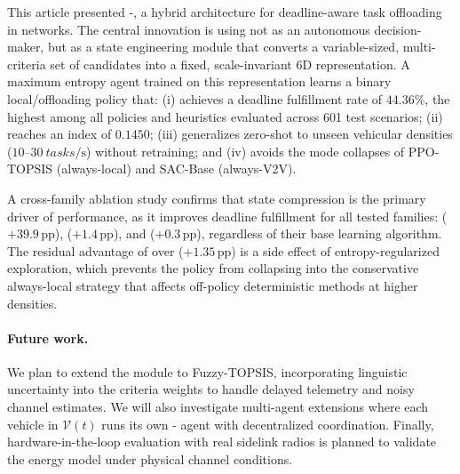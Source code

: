 This article presented -, a hybrid architecture for deadline-aware task offloading in  networks. The central innovation is using  not as an autonomous decision-maker, but as a state engineering module that converts a variable-sized, multi-criteria set of candidates into a fixed, scale-invariant 6D representation. A maximum entropy  agent trained on this representation learns a binary local/offloading policy that:
(i) achieves a deadline fulfillment rate of $44.36\%$, the highest among all  policies and heuristics evaluated across 601 test scenarios;
(ii) reaches an  index of $0.1450$;
(iii) generalizes zero-shot to unseen vehicular densities ($10$–$\SI{30}{tasks\per\second}$) without retraining;
and
(iv) avoids the mode collapses of PPO-TOPSIS (always-local) and SAC-Base (always-V2V).

A cross-family ablation study confirms that  state compression is the primary driver of performance, as it improves deadline fulfillment for all tested  families:  ($+39.9$\,pp),  ($+1.4$\,pp), and  ($+0.3$\,pp), regardless of their base learning algorithm. The residual advantage of  over  ($+1.35$\,pp) is a side effect of entropy-regularized exploration, which prevents the policy from collapsing into the conservative always-local strategy that affects off-policy deterministic methods at higher densities.

\paragraph{Future work.} We plan to extend the  module to Fuzzy-TOPSIS, incorporating linguistic uncertainty into the criteria weights to handle delayed telemetry and noisy channel estimates. We will also investigate multi-agent extensions where each vehicle in $\mathcal{V}(t)$ runs its own - agent with decentralized coordination. Finally, hardware-in-the-loop evaluation with real  sidelink radios is planned to validate the energy model under physical channel conditions.

